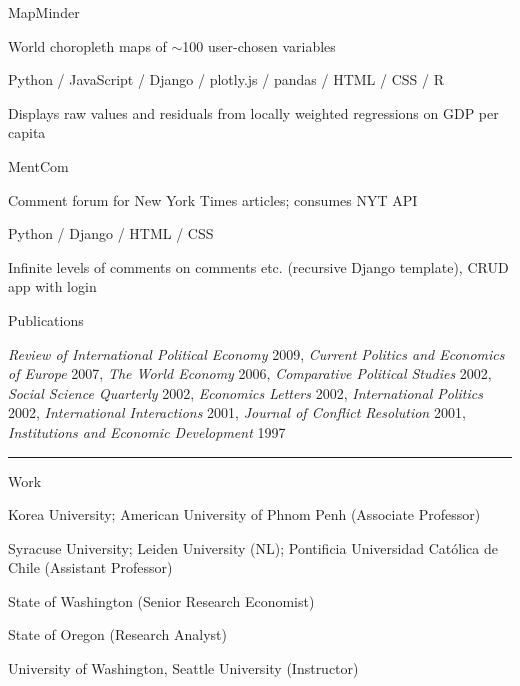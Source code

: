 \documentclass[letterpaper, english, 11pt]{article}
\newenvironment{packed_itemize}{
	\begin{itemize}
		\setlength{\itemsep}{1pt}
		\setlength{\parskip}{2pt}
		\setlength{\parsep}{2pt}
	} {\end{itemize}
}
\begin{document}
\begin{footnotesize}
	\begin{packed_itemize}
		\item{MapMinder}
			\begin{packed_itemize}
				\item World choropleth maps of $\sim$100 user-chosen variables
				\item Python / JavaScript  / Django / plotly.js / pandas / HTML / CSS / R
				\item Displays raw values and residuals from locally weighted regressions on GDP per capita
			\end{packed_itemize}
		\item{MentCom}
			\begin{packed_itemize}
				\item Comment forum for New York Times articles; consumes NYT API
				\item Python / Django / HTML / CSS
				\item Infinite levels of comments on comments etc. (recursive Django template), CRUD app with login
			\end{packed_itemize}
		\item{Publications}
			\begin{packed_itemize}
			\item \emph {Review of International Political Economy} 2009, 
				\emph{Current Politics and Economics of Europe} 2007, 
				\emph{The World Economy} 2006, 
				\emph{Comparative Political Studies} 2002, 
				\emph{Social Science Quarterly} 2002, 
				\emph{Economics Letters} 2002, 
				\emph{International Politics} 2002, 
				\emph{International Interactions} 2001, 
				\emph{Journal of Conflict Resolution} 2001, 
				\emph{Institutions and Economic Development} 1997
		\end{packed_itemize}
	\end{packed_itemize}
\end{footnotesize}

\vspace{6pt}
\hrule

Work

\begin{footnotesize}
	\begin{packed_itemize}
		\item Korea University; American University of Phnom Penh (Associate Professor)
		\item Syracuse University; Leiden University (NL); Pontificia Universidad Cat{\'o}lica de Chile (Assistant Professor)
		\item State of Washington (Senior Research Economist)
		\item State of Oregon (Research Analyst)
		\item University of Washington, Seattle University (Instructor)
	\end{packed_itemize}
\end{footnotesize}
\end{document}
